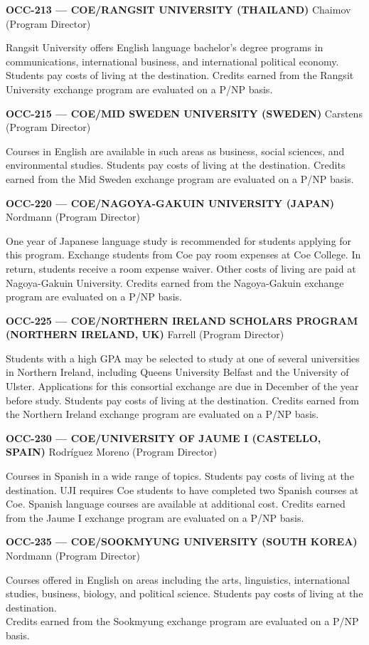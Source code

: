 \documentclass[
  letterpaper,
]{scrbook}
\begin{document}
\textbf{OCC-213 --- COE/RANGSIT UNIVERSITY (THAILAND)} Chaimov (Program
Director)

Rangsit University offers English language bachelor's degree programs in
communications, international business, and international political
economy. Students pay costs of living at the destination. Credits earned
from the Rangsit University exchange program are evaluated on a P/NP
basis.

\textbf{OCC-215 --- COE/MID SWEDEN UNIVERSITY (SWEDEN)} Carstens
(Program Director)

Courses in English are available in such areas as business, social
sciences, and environmental studies. Students pay costs of living at the
destination. Credits earned from the Mid Sweden exchange program are
evaluated on a P/NP basis.

\textbf{OCC-220 --- COE/NAGOYA-GAKUIN UNIVERSITY (JAPAN)} Nordmann
(Program Director)

One year of Japanese language study is recommended for students applying
for this program. Exchange students from Coe pay room expenses at Coe
College. In return, students receive a room expense waiver. Other costs
of living are paid at Nagoya-Gakuin University. Credits earned from the
Nagoya-Gakuin exchange program are evaluated on a P/NP basis.

\textbf{OCC-225 --- COE/NORTHERN IRELAND SCHOLARS PROGRAM (NORTHERN
IRELAND, UK)} Farrell (Program Director)

Students with a high GPA may be selected to study at one of several
universities in Northern Ireland, including Queens University Belfast
and the University of Ulster. Applications for this consortial exchange
are due in December of the year before study. Students pay costs of
living at the destination. Credits earned from the Northern Ireland
exchange program are evaluated on a P/NP basis.

\textbf{OCC-230 --- COE/UNIVERSITY OF JAUME I (CASTELLO, SPAIN)}
Rodríguez Moreno (Program Director)

Courses in Spanish in a wide range of topics. Students pay costs of
living at the destination. UJI requires Coe students to have completed
two Spanish courses at Coe. Spanish language courses are available at
additional cost. Credits earned from the Jaume I exchange program are
evaluated on a P/NP basis.

\textbf{OCC-235 --- COE/SOOKMYUNG UNIVERSITY (SOUTH KOREA)} Nordmann
(Program Director)

Courses offered in English on areas including the arts, linguistics,
international studies, business, biology, and political science.
Students pay costs of living at the destination.\\
Credits earned from the Sookmyung exchange program are evaluated on a
P/NP basis.
\end{document}
